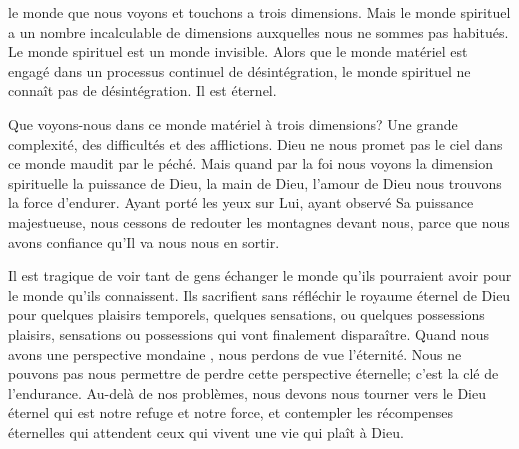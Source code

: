 


 \ocadr le monde que nous voyons et touchons \fcadr{} a trois dimensions.
 Mais le monde spirituel a un nombre incalculable de dimensions auxquelles
 nous ne sommes pas habitués. Le monde spirituel est un monde invisible.
 Alors que le monde matériel est engagé dans un processus
 continuel de désintégration, le monde spirituel ne connaît pas
 de désintégration. Il est éternel.


Que voyons-nous dans ce monde matériel à trois dimensions?
 Une grande complexité, des difficultés et des afflictions.
 Dieu ne nous promet pas le ciel dans ce monde maudit par le péché.
 Mais quand par la foi nous voyons la dimension spirituelle
 \ocadr la puissance de Dieu, la main de Dieu, l'amour de Dieu \fcadr{}
 nous trouvons la force d'endurer. Ayant porté les yeux sur Lui,
 ayant observé Sa puissance majestueuse, nous cessons de redouter
 les montagnes devant nous, parce que nous avons confiance
 qu'Il va nous nous en sortir.

Il est tragique de voir tant de gens échanger le monde
 qu'ils pourraient 
 avoir pour le monde qu'ils connaissent.
 Ils sacrifient sans réfléchir le royaume éternel de Dieu
 pour quelques plaisirs temporels, quelques sensations, ou quelques possessions
 \ocadr plaisirs, sensations ou possessions qui vont finalement disparaître.
 Quand nous avons une perspective mondaine ,
 nous perdons de vue l'éternité. Nous ne pouvons pas nous permettre de perdre
 cette perspective éternelle; c'est la clé de l'endurance.
 Au-delà de nos problèmes, nous devons nous tourner vers le Dieu éternel
 qui est notre refuge et notre force, et contempler les récompenses
 éternelles qui attendent ceux qui vivent une vie qui plaît à Dieu.

\dvrule




